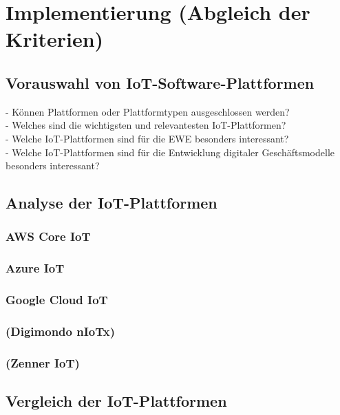 \chapter{Implementierung (Abgleich der Kriterien)}\label{ch:Implementierung (Abgleich der Kriterien)}
\section{Vorauswahl von IoT-Software-Plattformen}\label{sec:Vorauswahl von IoT-Software-Plattformen}
- Können Plattformen oder Plattformtypen ausgeschlossen werden?\\
- Welches sind die wichtigsten und relevantesten IoT-Plattformen?\\
- Welche IoT-Plattformen sind für die EWE besonders interessant?\\
- Welche IoT-Plattformen sind für die Entwicklung  digitaler Geschäftsmodelle besonders interessant?\\
\section{Analyse der IoT-Plattformen}\label{sec:Analyse der IoT-Plattformen}
\subsection{AWS Core IoT}\label{subsec:AWS Core IoT}
\subsection{Azure IoT}\label{subsec:Azure IoT}
\subsection{Google Cloud IoT}\label{subsec:Google Cloud IoT}
\subsection{(Digimondo nIoTx)}\label{subsec:(Digimondo nIoTx)}
\subsection{(Zenner IoT)}\label{subsec:(Zenner IoT)}
\section{Vergleich der IoT-Plattformen}\label{sec:Vergleich der IoT-Plattformen}
